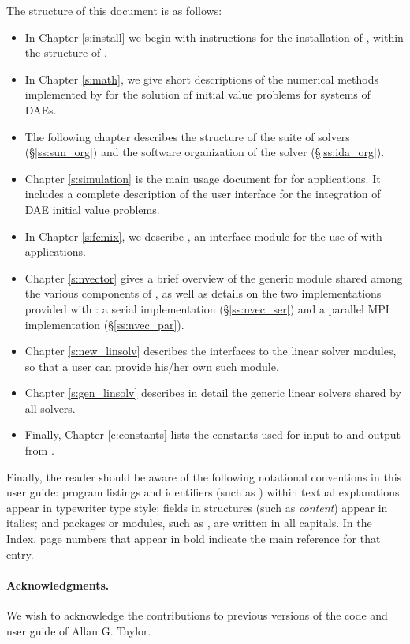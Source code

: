 The structure of this document is as follows:
\begin{itemize}
\item
  In Chapter \ref{s:install} we begin with instructions for the installation of 
  {\ida}, within the structure of {\sundials}.
\item
  In Chapter \ref{s:math}, we give short descriptions of the numerical 
  methods implemented by {\ida} for the solution of initial value problems
  for systems of DAEs.
\item
  The following chapter describes the structure of the {\sundials} suite
  of solvers (\S\ref{ss:sun_org}) and the software organization of the {\ida}
  solver (\S\ref{ss:ida_org}). 
\item
  Chapter \ref{s:simulation} is the main usage document for {\ida} for
  {\C} applications.  It includes a complete description of the user interface
  for the integration of DAE initial value problems.
\item
  In Chapter \ref{s:fcmix}, we describe {\fida}, an interface module
  for the use of {\ida} with {\F} applications.
\item
  Chapter \ref{s:nvector} gives a brief overview of the generic {\nvector} module 
  shared among the various components of {\sundials}, as well as details on the two
  {\nvector} implementations provided with {\sundials}: a serial implementation
  (\S\ref{ss:nvec_ser}) and a parallel MPI implementation (\S\ref{ss:nvec_par}).
\item
  Chapter \ref{s:new_linsolv} describes the interfaces to the linear solver
  modules, so that a user can provide his/her own such module.
\item
  Chapter \ref{s:gen_linsolv} describes in detail the generic linear solvers shared 
  by all {\sundials} solvers.
\item
  Finally, Chapter \ref{c:constants} lists the constants used for input to
  and output from {\ida}.
\end{itemize}

Finally, the reader should be aware of the following notational conventions
in this user guide:  program listings and identifiers (such as ) 
within textual explanations appear in typewriter type style; 
fields in {\C} structures (such as {\em content}) appear in italics;
and packages or modules, such as {\idadense}, are written in all capitals. 
In the Index, page numbers that appear in bold indicate the main reference
for that entry.

\paragraph{Acknowledgments.}
We wish to acknowledge the contributions to previous versions of the
{\ida} code and user guide of Allan G. Taylor.

